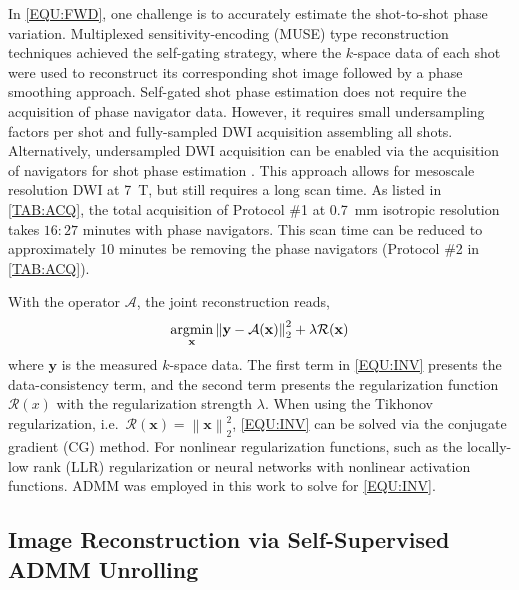 \documentclass[AMA,STIX2COL,Linenumberson]{MRM}
\newcommand{\argmin}{\operatornamewithlimits{argmin}}
\newcommand{\norm}[1]{\left\lVert#1\right\rVert}
\begin{document}
In \cref{EQU:FWD}, one challenge is
to accurately estimate the shot-to-shot phase variation.
Multiplexed sensitivity-encoding (MUSE) type reconstruction techniques
\cite{liu_2004_diff_spiral,uecker_2009_nlinv_diff,chen_2013_muse,merrem_2019_nl_steam}
achieved the self-gating strategy,
where the $k$-space data of each shot were used to reconstruct
its corresponding shot image followed by a phase smoothing approach.
Self-gated shot phase estimation does not require
the acquisition of phase navigator data.
However, it requires small undersampling factors per shot and
fully-sampled DWI acquisition assembling all shots.
Alternatively, undersampled DWI acquisition can be enabled
via the acquisition of navigators for shot phase estimation
\cite{tan_2024_naviepi}.
This approach allows for mesoscale resolution DWI at \SI{7}{\tesla},
but still requires a long scan time.
As listed in \cref{TAB:ACQ}, the total acquisition of
Protocol \#1 at \SI{0.7}{mm} isotropic resolution
takes $16:27$ minutes with phase navigators.
This scan time can be reduced to approximately 10 minutes
be removing the phase navigators (Protocol \#2 in \cref{TAB:ACQ}).

With the operator $\mathcal{A}$, the joint reconstruction reads,
\begin{equation}
	\argmin_{\mathbf{x}} \norm{\mathbf{y} - \mathcal{A}(\mathbf{x})}_2^2 + \lambda \mathcal{R}(\mathbf{x})
	\label{EQU:INV}
\end{equation}
where $\mathbf{y}$ is the measured $k$-space data.
The first term in \cref{EQU:INV} presents the data-consistency term, and
the second term presents the regularization function $\mathcal{R}(x)$
with the regularization strength $\lambda$.
When using the Tikhonov regularization,
i.e.~$\mathcal{R}(\mathbf{x}) = \norm{\mathbf{x}}_2^2$,
\cref{EQU:INV} can be solved via the conjugate gradient (CG) method.
For nonlinear regularization functions,
such as the locally-low rank (LLR) regularization \cite{tan_2024_naviepi} or
neural networks with nonlinear activation functions.
ADMM was employed in this work to solve for \cref{EQU:INV}.

\subsection{Image Reconstruction via Self-Supervised ADMM Unrolling}
\end{document}
